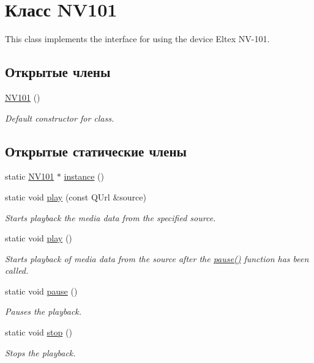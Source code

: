 \hypertarget{class_n_v101}{
\section{Класс NV101}
\label{d4/da9/class_n_v101}
}


This class implements the interface for using the device Eltex NV-\/101.  


\subsection*{Открытые члены}
\begin{DoxyCompactItemize}
\item 
\hyperlink{class_n_v101_ac7249ef2c3bee8463c0481a95062c2c6}{NV101} ()
\begin{DoxyCompactList}\small\item\em Default constructor for class. \end{DoxyCompactList}\end{DoxyCompactItemize}
\subsection*{Открытые статические члены}
\begin{DoxyCompactItemize}
\item 
static \hyperlink{class_n_v101}{NV101} $\ast$ \hyperlink{class_n_v101_a3ad4c8787cc817ee47b450aae185e526}{instance} ()
\item 
static void \hyperlink{class_n_v101_acf36a25efc769d71cf406a7b77c66282}{play} (const QUrl \&source)
\begin{DoxyCompactList}\small\item\em Starts playback the media data from the specified source. \end{DoxyCompactList}\item 
static void \hyperlink{class_n_v101_acacb87596e5568af2ebe0c953f7cd204}{play} ()
\begin{DoxyCompactList}\small\item\em Starts playback of media data from the source after the \hyperlink{class_n_v101_a28421157983681c1dbdbdcc1b504aaea}{pause()} function has been called. \end{DoxyCompactList}\item 
static void \hyperlink{class_n_v101_a28421157983681c1dbdbdcc1b504aaea}{pause} ()
\begin{DoxyCompactList}\small\item\em Pauses the playback. \end{DoxyCompactList}\item 
static void \hyperlink{class_n_v101_a55a43171a935456326f093f21d2ee554}{stop} ()
\begin{DoxyCompactList}\small\item\em Stops the playback. \end{DoxyCompactList}\end{DoxyCompactItemize}



